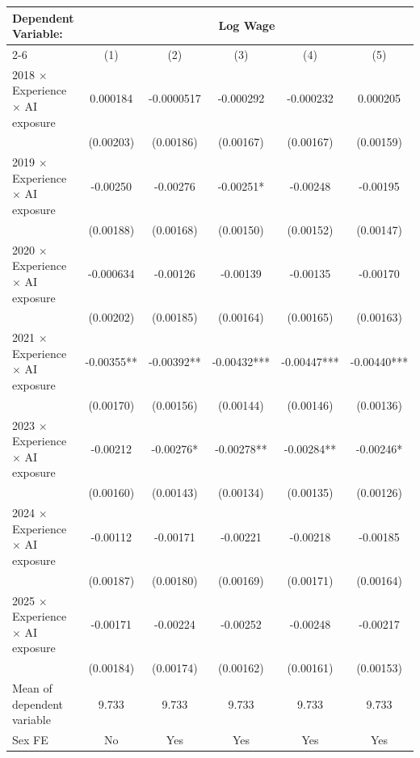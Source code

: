 \def\sym#1{\ifmmode^{#1}\else\(^{#1}\)\fi}
\begin{tabular}{l*{5}{c}}
\toprule
Dependent Variable: & \multicolumn{5}{c}{Log Wage} \\
\cmidrule(lr){2-6}
 & (1) & (2) & (3) & (4) & (5) \\
\midrule
2018 $\times$ Experience $\times$ AI exposure&    0.000184   &  -0.0000517   &   -0.000292   &   -0.000232   &    0.000205   \\
            &   (0.00203)   &   (0.00186)   &   (0.00167)   &   (0.00167)   &   (0.00159)   \\
2019 $\times$ Experience $\times$ AI exposure&    -0.00250   &    -0.00276   &    -0.00251*  &    -0.00248   &    -0.00195   \\
            &   (0.00188)   &   (0.00168)   &   (0.00150)   &   (0.00152)   &   (0.00147)   \\
2020 $\times$ Experience $\times$ AI exposure&   -0.000634   &    -0.00126   &    -0.00139   &    -0.00135   &    -0.00170   \\
            &   (0.00202)   &   (0.00185)   &   (0.00164)   &   (0.00165)   &   (0.00163)   \\
2021 $\times$ Experience $\times$ AI exposure&    -0.00355** &    -0.00392** &    -0.00432***&    -0.00447***&    -0.00440***\\
            &   (0.00170)   &   (0.00156)   &   (0.00144)   &   (0.00146)   &   (0.00136)   \\
2023 $\times$ Experience $\times$ AI exposure&    -0.00212   &    -0.00276*  &    -0.00278** &    -0.00284** &    -0.00246*  \\
            &   (0.00160)   &   (0.00143)   &   (0.00134)   &   (0.00135)   &   (0.00126)   \\
2024 $\times$ Experience $\times$ AI exposure&    -0.00112   &    -0.00171   &    -0.00221   &    -0.00218   &    -0.00185   \\
            &   (0.00187)   &   (0.00180)   &   (0.00169)   &   (0.00171)   &   (0.00164)   \\
2025 $\times$ Experience $\times$ AI exposure&    -0.00171   &    -0.00224   &    -0.00252   &    -0.00248   &    -0.00217   \\
            &   (0.00184)   &   (0.00174)   &   (0.00162)   &   (0.00161)   &   (0.00153)   \\
\midrule
Mean of dependent variable&       9.733   &       9.733   &       9.733   &       9.733   &       9.733   \\
Sex FE      &          No   &         Yes   &         Yes   &         Yes   &         Yes   \\

\end{tabular}
